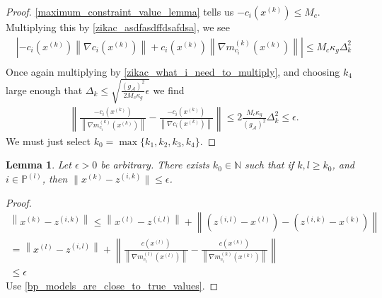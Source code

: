 \documentclass{article}
\newtheorem{lemma}[theorem]{Lemma}
\theoremstyle{case}
\numberwithin{theorem}{subsection}
\newcommand{\dk}{\Delta_k}
\newcommand{\gmcik}{{\nabla m_{c_i}^{(k)}\left(\xk\right)}}
\newcommand{\gmcil}{{\nabla m_{c_i}^{(l)}\left(\xl\right)}}
\newcommand{\minactivegrad}{{ g_{\mathcal A} }}
\newcommand{\naturals}{\mathbb N}
\newcommand{\xk}{{x^{(k)}}}
\newcommand{\xl}{{x^{(l)}}}
\newcommand{\zik}{{z^{(i, k)}}}
\newcommand{\zil}{{z^{(i, l)}}}
\newcommand{\activeprojl}{{\mathbb P^{(l)}}}
\begin{document}
\begin{proof}
\cref{maximum_constraint_value_lemma} tells us
$-c_i\left(\xk\right) \le M_c$.
Multiplying this by \cref{zikac_asdfasdffdsafdsa}, we see
\begin{align*}
\left|-c_i\left(\xk\right)\left\|\nabla c_i\left(\xk \right)\right\| + c_i\left(\xk\right)\left\|\gmcik\right\|\right| \le M_c \kappa_g \dk^2 \\
\end{align*}
Once again multiplying by \cref{zikac_what_i_need_to_multiply}, and choosing $k_4$ large enough that 
$\dk \le \sqrt{\frac{\left(\minactivegrad\right)^2}{2M_c \kappa_g} \epsilon}$
we find
\begin{align*}
\left\|\frac{-c_i\left(\xk \right)}{\left\|\gmcik\right\|} - \frac{-c_i\left(\xk \right)}{\left\|\nabla c_i\left(\xk \right)\right\|} \right\|
\le 2\frac{M_c \kappa_g}{\left(\minactivegrad\right)^2} \dk^2
\le \epsilon.
\end{align*}
We must just select $k_0 = \max\{k_1, k_2, k_3, k_4\}$.
\end{proof}























\begin{lemma}
\label{close_to_active_means_close}
Let $\epsilon > 0$ be arbitrary.
There exists $k_0 \in \naturals$ such that if $k, l \ge k_0$, and $i \in \activeprojl$, then $\|\xk - \zik\| \le \epsilon$.
\end{lemma}
\begin{proof}
\begin{align*}
\left\|\xk - \zik \right\| \le \left\|\xl - \zil \right\| + \left\|\left(\zil - \xl\right) - \left(\zik - \xk\right) \right\| \\
= \left\|\xl - \zil \right\| + \left\|\frac{c\left(\xl\right)}{\left\|\gmcil\right\|} - \frac{c\left(\xk\right)}{\left\|\gmcik\right\|} \right\| \\
\le \epsilon
\end{align*}
Use \cref{bp_models_are_close_to_true_values}.
\end{proof}
\end{document}
